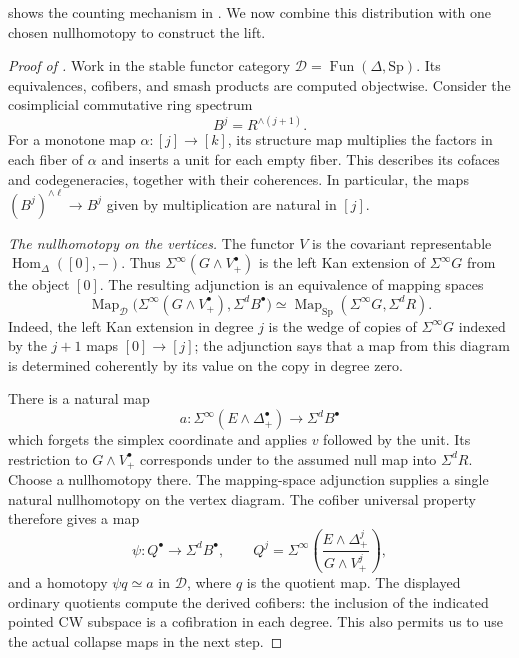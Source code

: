  shows the counting mechanism in
.  We now combine this distribution with
one chosen nullhomotopy to construct the lift.

\begin{proof}[Proof of ]
Work in the stable functor category
$\mathcal D=\operatorname{Fun}(\Delta,\mathrm{Sp})$.
Its equivalences, cofibers, and smash products are computed objectwise.
Consider the cosimplicial commutative ring spectrum
\[
B^j=R^{\wedge(j+1)}.
\]
For a monotone map $\alpha:[j]\to[k]$, its structure map multiplies
the factors in each fiber of $\alpha$ and inserts a unit for each
empty fiber.  This describes its cofaces and codegeneracies, together
with their coherences.  In particular, the maps
$(B^j)^{\wedge\ell}\to B^j$ given by multiplication are natural in
$[j]$.

\smallskip
\noindent\emph{The nullhomotopy on the vertices.}
The functor $V$ is the covariant representable
$\operatorname{Hom}_\Delta([0],-)$.  Thus
$\Sigma^\infty(G\wedge V^\bullet_+)$ is the left Kan extension of
$\Sigma^\infty G$ from the object $[0]$.  The resulting adjunction is
an equivalence of mapping spaces
\begin{equation}
\label{eq:vertices-yoneda}
\operatorname{Map}_{\mathcal D}
 \bigl(\Sigma^\infty(G\wedge V^\bullet_+),\Sigma^dB^\bullet\bigr)
\simeq
\operatorname{Map}_{\mathrm{Sp}}(\Sigma^\infty G,\Sigma^dR).
\end{equation}
Indeed, the left Kan extension in degree $j$ is the wedge of copies of
$\Sigma^\infty G$ indexed by the $j+1$ maps $[0]\to[j]$; the
adjunction says that a map from this diagram is determined coherently
by its value on the copy in degree zero.

There is a natural map
\[
a:\Sigma^\infty(E\wedge\Delta^\bullet_+)
 \longrightarrow\Sigma^dB^\bullet
\]
which forgets the simplex coordinate and applies $v$ followed by the
unit.  Its restriction to $G\wedge V^\bullet_+$ corresponds under
 to the assumed null map into $\Sigma^dR$.
Choose a nullhomotopy there.  The mapping-space adjunction supplies a
single natural nullhomotopy on the vertex diagram.  The cofiber
universal property therefore gives a map
\[
\psi:Q^\bullet\longrightarrow\Sigma^dB^\bullet,
\qquad
Q^j=\Sigma^\infty\left(
 \frac{E\wedge\Delta^j_+}{G\wedge V^j_+}\right),
\]
and a homotopy $\psi q\simeq a$ in $\mathcal D$, where $q$ is the
quotient map.  The displayed ordinary quotients compute the derived
cofibers: the inclusion of the indicated pointed CW subspace is a
cofibration in each degree.  This also permits us to use the actual
collapse maps in the next step.


\end{proof}
